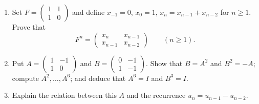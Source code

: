 \begin{problem}\label{ex:02:recurrences}
\begin{enumerate}
\item Set $F=\begin{pmatrix}1&1\\1&0\end{pmatrix}$ and define
$x_{-1}=0$, $x_0=1$, $x_n=x_{n-1}+x_{n-2}$ for $n\geqslant1$.
Prove that
\[
F^n=\begin{pmatrix}x_n&x_{n-1}\\x_{n-1}&x_{n-2}\end{pmatrix}\qquad(n\geqslant1).
\]
\item Put $A=\begin{pmatrix}1&-1\\1&0\end{pmatrix}$ and
$B=\begin{pmatrix}0&-1\\1&-1\end{pmatrix}$.
Show that $B=A^2$ and $B^2=-A$; compute $A^2,\ldots,A^6$;
and deduce that $A^6=I$ and $B^3=I$.
\item Explain the relation between this $A$ and the recurrence
$u_n=u_{n-1}-u_{n-2}$.
\end{enumerate}
\end{problem}

